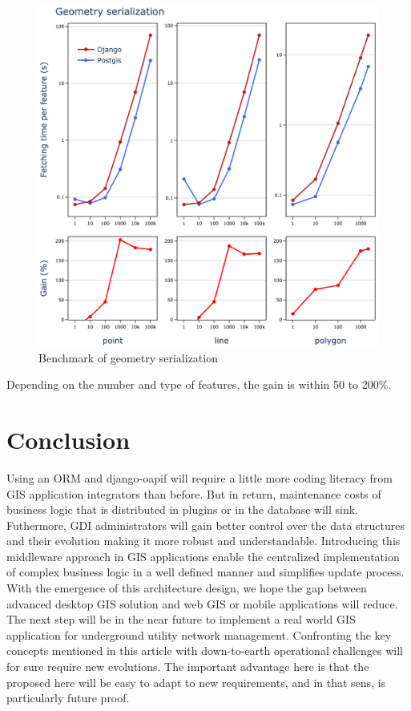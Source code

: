 \documentclass[runningheads]{llncs}
\begin{document}
\begin{figure}
	\includegraphics[width=\textwidth]{benchmarckb.png}
	\caption{Benchmark of geometry serialization} \label{fig6}
\end{figure}

Depending on the number and type of features, the gain is within 50 to 200\%.


\section{Conclusion}

Using an ORM and django-oapif will require a little more coding literacy from GIS application integrators than before. But in return, maintenance costs of business logic that is distributed in plugins or in the database will sink. Futhermore, GDI administrators will gain better control over the data structures and their evolution making it more robust and understandable. Introducing this middleware approach in GIS applications enable the centralized implementation of complex business logic in a  well defined manner and simplifies update process. With the emergence of this architecture design, we hope the gap between advanced desktop GIS solution and web GIS or mobile applications will reduce. The next step will be in the near future to implement a real world GIS application for underground utility network management. Confronting the key concepts mentioned in this article with down-to-earth operational challenges will for sure require new evolutions. The important advantage here is that the proposed here will be easy to adapt to new requirements, and in that sens, is particularly future proof. 
\end{document}
